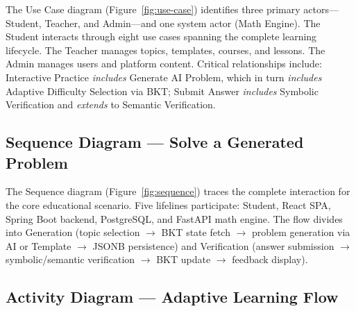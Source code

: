 
The Use Case diagram (Figure~\ref{fig:use-case}) identifies three primary actors---Student, Teacher, and Admin---and one system actor (Math Engine). The Student interacts through eight use cases spanning the complete learning lifecycle. The Teacher manages topics, templates, courses, and lessons. The Admin manages users and platform content. Critical relationships include: Interactive Practice \textit{includes} Generate AI Problem, which in turn \textit{includes} Adaptive Difficulty Selection via BKT; Submit Answer \textit{includes} Symbolic Verification and \textit{extends} to Semantic Verification.

\subsection{Sequence Diagram --- Solve a Generated Problem}
\label{subsec:sequence}


The Sequence diagram (Figure~\ref{fig:sequence}) traces the complete interaction for the core educational scenario. Five lifelines participate: Student, React SPA, Spring Boot backend, PostgreSQL, and FastAPI math engine. The flow divides into Generation (topic selection $\rightarrow$ BKT state fetch $\rightarrow$ problem generation via AI or Template $\rightarrow$ JSONB persistence) and Verification (answer submission $\rightarrow$ symbolic/semantic verification $\rightarrow$ BKT update $\rightarrow$ feedback display).

\subsection{Activity Diagram --- Adaptive Learning Flow}
\label{subsec:activity}


